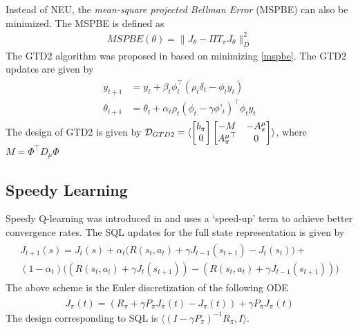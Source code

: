 Instead of NEU, the \emph{mean-square projected Bellman Error} (MSPBE) can also be minimized. The MSPBE is defined as
\begin{align}\label{mspbe}
MSPBE(\theta)=\parallel J_\theta-\Pi T_\pi J_\theta \parallel^2_D
\end{align}
The GTD2 algorithm was proposed in \cite{} based on minimizing \eqref{mspbe}. The GTD2 updates are given by
\begin{align}
\begin{split}
y_{t+1}&=y_t+\beta_t\phi_t^\top(\rho_t\delta_t-\phi_t y_t)\\
\theta_{t+1}&=\theta_t+\alpha_t\rho_t(\phi_t-\gamma\phi’_t)^\top\phi_t y_t
\end{split}
\end{align}
The design of GTD2 is given by $\mathcal{D}_{GTD2}=\langle \begin{bmatrix}b_\pi\\ 0\\ \end{bmatrix} \begin{bmatrix}-M &-A^\mu_\pi \\ {A^\mu_\pi}^\top &0 \\ \end{bmatrix}\rangle$, where $M=\Phi^\top D_\mu\Phi$
\subsection{Speedy Learning}
Speedy Q-learning was introduced in \cite{} and uses a `speed-up’ term to achieve better convergence rates. The SQL updates for the full state representation is given by
\begin{align}\label{sql}
\begin{split}
J_{t+1}(s)=J_t(s)+\alpha_t\big(R(s_t,a_t)+\gamma J_{t-1}(s_{t+1})-J_{t}(s_t) \big)+\\(1-\alpha_t)\big((R(s_t,a_t)+\gamma J_t(s_{t+1}))-(R(s_t,a_t)+\gamma J_{t-1}(s_{t+1}))\big)
\end{split}
\end{align}
The above scheme is the Euler discretization of the following ODE
\begin{align}
\dot{J_\pi}(t)=(R_\pi+\gamma P_\pi J_\pi(t) -J_\pi(t))+\gamma P_\pi\dot{J_\pi}(t)
\end{align}
The design corresponding to SQL is $\langle(I-\gamma P_\pi)^{-1}R_\pi,I\rangle$.
